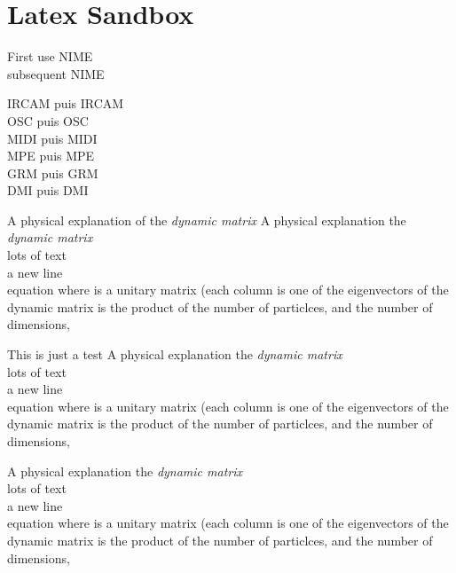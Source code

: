 %
\chapter{Latex Sandbox}
\label{ch:latex_sandbox}

First use \gls{NIME}\\
subsequent \gls{NIME}

\gls{IRCAM} puis \gls{IRCAM}\\
\gls{OSC} puis \gls{OSC}\\
\gls{MIDI} puis \gls{MIDI}\\
\gls{MPE} puis \gls{MPE}\\
\gls{GRM} puis \gls{GRM}\\
\gls{DMI} puis \gls{DMI}\\


\begin{titlebox}{A physical explanation of the \emph{dynamic matrix}}
A physical explanation the \emph{dynamic matrix}\\
lots of text\\
a new line\\
equation
where  is a unitary matrix (each column is one of the eigenvectors of the dynamic matrix is the product of the number of particlces, and the number of dimensions,
\end{titlebox}

\begin{notebox}{This is just a test}
A physical explanation the \emph{dynamic matrix}\\
lots of text\\
a new line\\
equation
where  is a unitary matrix (each column is one of the eigenvectors of the dynamic matrix is the product of the number of particlces, and the number of dimensions,
\end{notebox}

\begin{notebox}
A physical explanation the \emph{dynamic matrix}\\
lots of text\\
a new line\\
equation
where  is a unitary matrix (each column is one of the eigenvectors of the dynamic matrix is the product of the number of particlces, and the number of dimensions,
\end{notebox}
